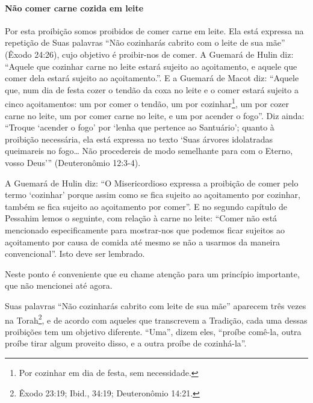 \paragraph{Não comer carne cozida em leite}

Por esta proibição somos proibidos de comer carne em leite. Ela está
expressa na repetição de Suas palavras ``Não cozinharás cabrito com o
leite de sua mãe'' (Êxodo 24:26), cujo objetivo é proibir-nos de comer.
A Guemará de Hulin diz: ``Aquele que cozinhar carne no leite estará
sujeito ao açoitamento, e aquele que comer dela estará sujeito ao
açoitamento.''. E a Guemará de Macot diz: ``Aquele que, num dia de festa
cozer o tendão da coxa no leite e o comer estará sujeito a cinco
açoitamentos: um por comer o tendão, um por
cozinhar\footnote{Por cozinhar em dia de festa, sem necessidade.}, um por cozer carne no leite, um por
comer carne no leite, e um por acender o fogo''. Diz ainda: ``Troque
`acender o fogo' por `lenha que pertence ao Santuário'; quanto à
proibição necessária, ela está expressa no texto `Suas árvores
idolatradas queimareis no fogo\ldots{} Não procedereis de modo semelhante
para com o Eterno, vosso Deus''' (Deuteronômio 12:3-4).

A Guemará de Hulin diz: ``O Misericordioso expressa a proibição de comer
pelo termo `cozinhar' porque assim como se fica sujeito ao açoitamento
por cozinhar, também se fica sujeito ao açoitamento por comer''. E no
segundo capítulo de Pessahim lemos o seguinte, com relação à carne no
leite: ``Comer não está mencionado especificamente para mostrar-nos que
podemos ficar sujeitos ao açoitamento por causa de comida até mesmo se
não a usarmos da maneira convencional''. Isto deve ser lembrado.

Neste ponto é conveniente que eu chame atenção para um princípio
importante, que não mencionei até agora.

Suas palavras ``Não cozinharás cabrito com leite de sua mãe'' aparecem
três vezes na Torah\footnote{Êxodo 23:19; Ibid., 34:19; Deuteronômio 14:21.}, e de acordo com aqueles que
transcrevem a Tradição, cada uma dessas proibições tem um objetivo
diferente. ``Uma'', dizem eles, ``proíbe comê-la, outra proíbe tirar
algum proveito disso, e a outra proíbe de cozinhá-la''.

